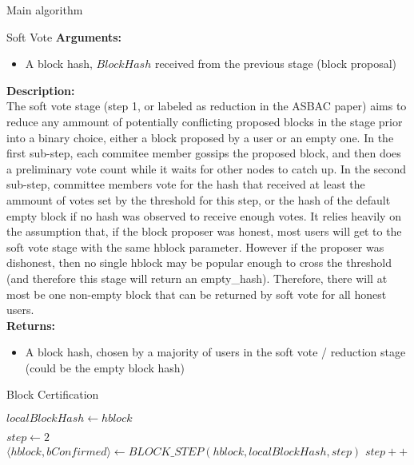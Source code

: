 \documentclass[10pt,a4paper]{article}
\begin{document}
\begin{section}{Main algorithm}
\begin{subsection}{Soft Vote}
\noindent \textbf{Arguments:}
\begin{itemize}
    \item A block hash, $BlockHash$ received from the previous stage (block proposal)
  \end{itemize}

\noindent \textbf{Description:}\\
The soft vote stage (step 1, or labeled as reduction in the ASBAC paper) aims to reduce any ammount of potentially conflicting proposed blocks in the stage prior into a binary choice, either a block proposed by a user or an empty one.
In the first sub-step, each commitee member gossips the proposed block, and then does a preliminary vote count while it waits for other nodes to catch up.
In the second sub-step, committee members vote for the hash that received at least the ammount of votes set by the threshold for this step, or the hash of the default empty block if no hash was observed to receive enough votes.
It relies heavily on the assumption that, if the block proposer was honest, most users will get to the soft vote stage with the same hblock parameter.
However if the proposer was dishonest, then no single hblock may be popular enough to cross the threshold (and therefore this stage will return an empty\_hash).
Therefore, there will at most be one non-empty block that can be returned by soft vote for all honest users.\\

\noindent \textbf{Returns:}
\begin{itemize}
    \item A block hash, chosen by a majority of users in the soft vote / reduction stage 
    (could be the empty block hash)
  \end{itemize}



\end{subsection}
\begin{subsection}{Block Certification}
    \begin{algorithm}[H]
        \begin{algorithmic}[H]
        \State $localBlockHash \gets hblock$
    
        \State $step \gets 2$
            \\
            \State $\langle hblock, bConfirmed \rangle \gets BLOCK\_STEP(hblock, localBlockHash, step)$
            \EndIf
            \State $step++$\\
       

\end{algorithmic}
\end{algorithm}
\end{subsection}
\end{section}
\end{document}
